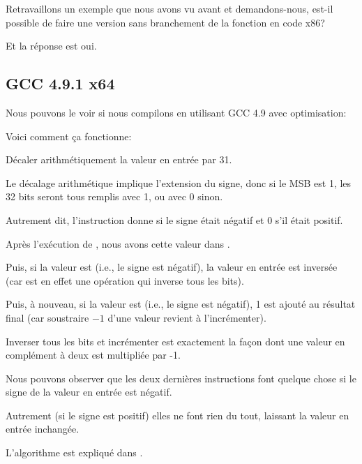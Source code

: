 \label{chap:branchless_abs}

Retravaillons un exemple que nous avons vu avant  et demandons-nous,
est-il possible de faire une version sans branchement de la fonction en code x86?



Et la réponse est oui.

\subsection{GCC 4.9.1 x64 \Optimizing}

Nous pouvons le voir si nous compilons en utilisant GCC 4.9 avec optimisation:



Voici comment ça fonctionne:

Décaler arithmétiquement la valeur en entrée par 31.

Le décalage arithmétique implique l'extension du signe, donc si le \ac{MSB} est 1,
les 32 bits seront tous remplis avec  1, ou avec 0 sinon.

Autrement dit, l'instruction  donne  si le signe
était négatif et 0 s'il était positif.

Après l'exécution de , nous avons cette valeur dans \EDX.

Puis, si la valeur est  (i.e., le signe est négatif), la valeur en
entrée est inversée (car  est en effet une opération qui
inverse tous les bits).

Puis, à nouveau, si la valeur est  (i.e., le signe est négatif), 1
est ajouté au résultat final (car soustraire $-1$ d'une valeur revient à l'incrémenter).

Inverser tous les bits et incrémenter est exactement la façon dont une valeur en
complément à deux est multipliée par -1.

Nous pouvons observer que les deux dernières instructions font quelque chose si le
signe de la valeur en entrée est négatif.

Autrement (si le signe est positif) elles ne font rien du tout, laissant la valeur
en entrée inchangée.

L'algorithme est expliqué dans .


